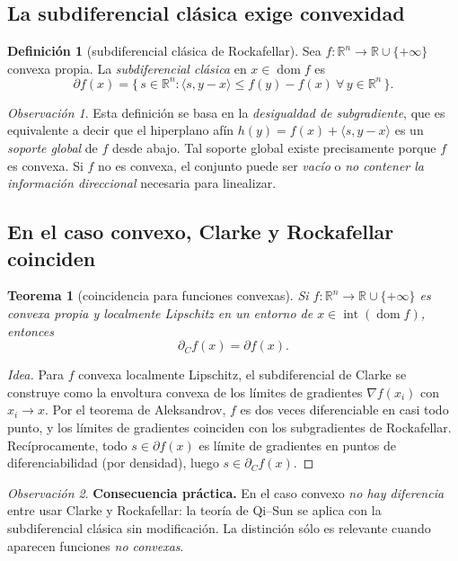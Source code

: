 \documentclass[12pt]{book}
\newcommand{\R}{\mathbb{R}}
\newcommand{\dom}{\operatorname{dom}}
\newcommand{\inter}{\operatorname{int}}
\newcommand{\subdiffC}{\partial_C}
\newcommand{\subdiffR}{\partial}
\theoremstyle{definition}
\newtheorem{definicion}{Definición}[section]
\theoremstyle{plain}
\newtheorem{teorema}{Teorema}[section]
\theoremstyle{remark}
\newtheorem{observacion}{Observación}[section]
\begin{document}
\subsection{La subdiferencial clásica exige convexidad}

\begin{definicion}[subdiferencial clásica de Rockafellar]
  Sea $f:\R^n\to\R\cup\{+\infty\}$ convexa propia.  La
  \emph{subdiferencial clásica} en $x\in\dom f$ es
  \[
    \subdiffR f(x)=\bigl\{\,s\in\R^n:\langle s,y-x\rangle\le f(y)-f(x)
    \ \forall\,y\in\R^n\,\bigr\}.
  \]
\end{definicion}

\begin{observacion}
  Esta definición se basa en la \emph{desigualdad de subgradiente},
  que es equivalente a decir que el hiperplano afín
  $h(y)=f(x)+\langle s,y-x\rangle$ es un \emph{soporte global} de
  $f$ desde abajo.  Tal soporte global existe precisamente porque $f$
  es convexa.  Si $f$ no es convexa, el conjunto puede ser
  \emph{vacío} o \emph{no contener la información direccional}
  necesaria para linealizar.
\end{observacion}

\subsection{En el caso convexo, Clarke y Rockafellar coinciden}

\begin{teorema}[coincidencia para funciones convexas]
  Si $f:\R^n\to\R\cup\{+\infty\}$ es convexa propia y
  localmente Lipschitz en un entorno de $x\in\inter(\dom f)$,
  entonces
  \[
    \boxed{\;\subdiffC f(x)=\subdiffR f(x).\;}
  \]
\end{teorema}

\begin{proof}[Idea]
  Para $f$ convexa localmente Lipschitz, el subdiferencial de Clarke
  se construye como la envoltura convexa de los límites de gradientes
  $\nabla f(x_i)$ con $x_i\to x$.  Por el teorema de
  Aleksandrov, $f$ es dos veces diferenciable en casi todo punto, y
  los límites de gradientes coinciden con los subgradientes de
  Rockafellar.  Recíprocamente, todo $s\in\subdiffR f(x)$ es límite de
  gradientes en puntos de diferenciabilidad (por densidad), luego
  $s\in\subdiffC f(x)$.
\end{proof}

\begin{observacion}
  \textbf{Consecuencia práctica.}  En el caso convexo \emph{no hay
  diferencia} entre usar Clarke y Rockafellar: la teoría de Qi--Sun
  se aplica con la subdiferencial clásica sin modificación.  La
  distinción sólo es relevante cuando aparecen funciones
  \emph{no convexas}.
\end{observacion}
\end{document}
